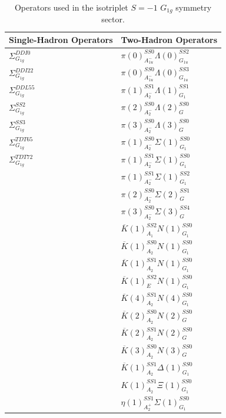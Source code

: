 \begin{table}[H]
    \centering
    \begin{tabular}{l|l}
        \textbf{Single-Hadron Operators} & \textbf{Two-Hadron Operators} \\
        \hline
        $\Sigma_{G_{1g}}^{DDI0}$ & $\pi(0)_{A_{1u}^-}^{SS0}\Lambda(0)_{G_{1u}}^{SS2}$\\
        $\Sigma_{G_{1g}}^{DDI22}$ & $\pi(0)_{A_{1u}^-}^{SS0}\Lambda(0)_{G_{1u}}^{SS3}$\\
        $\Sigma_{G_{1g}}^{DDL55}$ & $\pi(1)_{A_2^-}^{SS1}\Lambda(1)_{G_1}^{SS1}$\\
        $\Sigma_{G_{1g}}^{SS2}$ & $\pi(2)_{A_2^-}^{SS0}\Lambda(2)_{G}^{SS0}$\\
        $\Sigma_{G_{1g}}^{SS3}$ & $\pi(3)_{A_2^-}^{SS0}\Lambda(3)_{G}^{SS0}$\\
        $\Sigma_{G_{1g}}^{TDT65}$ & $\pi(1)_{A_2^-}^{SS0}\Sigma(1)_{G_1}^{SS0}$\\
        $\Sigma_{G_{1g}}^{TDT72}$ & $\pi(1)_{A_2^-}^{SS1}\Sigma(1)_{G_1}^{SS0}$\\
        & $\pi(1)_{A_2^-}^{SS1}\Sigma(1)_{G_1}^{SS2}$\\
        & $\pi(2)_{A_2^-}^{SS0}\Sigma(2)_{G}^{SS1}$\\
        & $\pi(3)_{A_2^-}^{SS0}\Sigma(3)_{G}^{SS4}$\\
        & $\overline K(1)_{A_1}^{SS2}N(1)_{G_1}^{SS0}$\\
        & $\overline K(1)_{A_2}^{SS0}N(1)_{G_1}^{SS0}$\\
        & $\overline K(1)_{A_2}^{SS1}N(1)_{G_1}^{SS0}$\\
        & $\overline K(1)_{E}^{SS2}N(1)_{G_1}^{SS0}$\\
        & $\overline K(4)_{A_2}^{SS1}N(4)_{G_1}^{SS0}$\\
        & $\overline K(2)_{A_2}^{SS0}N(2)_{G}^{SS0}$\\
        & $\overline K(2)_{A_2}^{SS1}N(2)_{G}^{SS0}$\\
        & $\overline K(3)_{A_2}^{SS0}N(3)_{G}^{SS0}$\\
        & $\overline K(1)_{A_2}^{SS1}\Delta(1)_{G_1}^{SS0}$\\
        & $K(1)_{A_2}^{SS1}\Xi(1)_{G_1}^{SS0}$\\
        & $\eta(1)_{A_2^+}^{SS1}\Sigma(1)_{G_1}^{SS0}$
    \end{tabular}
    \caption{Operators used in the isotriplet $S=-1$ $G_{1g}$ symmetry sector.}\label{table:g1g_ops}
\end{table}
